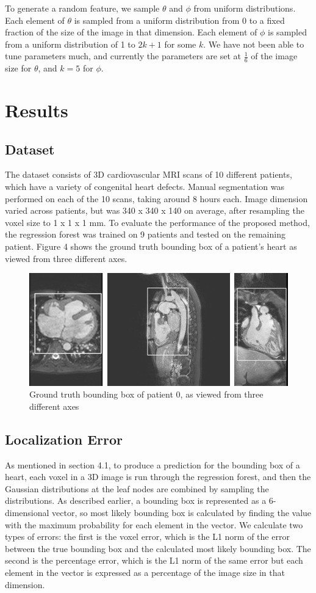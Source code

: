 To generate a random feature, we sample $\theta$ and $\phi$ from uniform distributions. Each element of $\theta$ is sampled from a uniform distribution from 0 to a fixed fraction of the size of the image in that dimension. Each element of $\phi$ is sampled from a uniform distribution of 1 to $2k+1$ for some $k$. We have not been able to tune parameters much, and currently the parameters are set at $\frac{1}{6}$ of the image size for $\theta$, and $k = 5$ for $\phi$. 

\section{Results}
\subsection{Dataset}
The dataset consists of 3D cardiovascular MRI scans of 10 different patients, which have a variety of congenital heart defects. Manual segmentation was performed on each of the 10 scans, taking around 8 hours each. Image dimension varied across patients, but was 340 x 340 x 140 on average, after resampling the voxel size to 1 x 1 x 1 mm. To evaluate the performance of the proposed method, the regression forest was trained on 9 patients and tested on the remaining patient. Figure 4 shows the ground truth bounding box of a patient's heart as viewed from three different axes.

\begin{figure}
\includegraphics[scale=1.0]{boundingboxes.png}
\caption{Ground truth bounding box of patient 0, as viewed from three different axes}
\end{figure}

\subsection{Localization Error}
As mentioned in section 4.1, to produce a prediction for the bounding box of a heart, each voxel in a 3D image is run through the regression forest, and then the Gaussian distributions at the leaf nodes are combined by sampling the distributions. As described earlier, a bounding box is represented as a 6-dimensional vector, so most likely bounding box is calculated by finding the value with the maximum probability for each element in the vector. We calculate two types of errors: the first is the voxel error, which is the L1 norm of the error between the true bounding box and the calculated most likely bounding box. The second is the percentage error, which is the L1 norm of the same error but each element in the vector is expressed as a percentage of the image size in that dimension.

